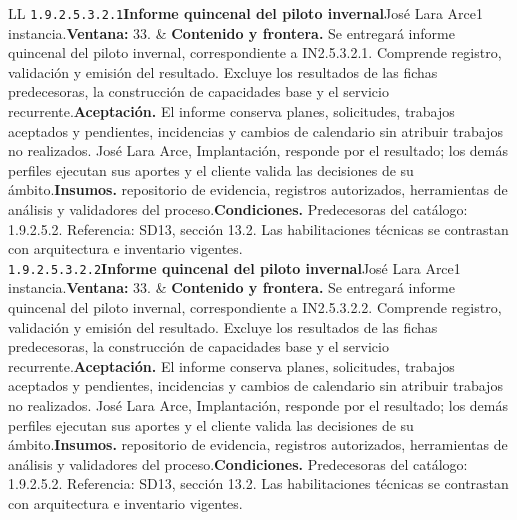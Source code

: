 \begin{longtable}{L{\tabcolsep\relax}L{\tabcolsep\relax}}
\texttt{1.\allowbreak{}9.\allowbreak{}2.\allowbreak{}5.\allowbreak{}3.\allowbreak{}2.\allowbreak{}1}\newline{}\textbf{Informe quincenal del piloto invernal}\newline{}José Lara Arce\newline{}1 instancia.\newline{}\textbf{Ventana:} 33. & \textbf{Contenido y frontera.} Se entregará informe quincenal del piloto invernal, correspondiente a IN2.5.3.2.1. Comprende registro, validación y emisión del resultado. Excluye los resultados de las fichas predecesoras, la construcción de capacidades base y el servicio recurrente.\newline{}\textbf{Aceptación.} El informe conserva planes, solicitudes, trabajos aceptados y pendientes, incidencias y cambios de calendario sin atribuir trabajos no realizados. José Lara Arce, Implantación, responde por el resultado; los demás perfiles ejecutan sus aportes y el cliente valida las decisiones de su ámbito.\newline{}\textbf{Insumos.} repositorio de evidencia, registros autorizados, herramientas de análisis y validadores del proceso.\newline{}\textbf{Condiciones.} Predecesoras del catálogo: 1.9.2.5.2. Referencia: SD13, sección 13.2. Las habilitaciones técnicas se contrastan con arquitectura e inventario vigentes.\\\hline
\texttt{1.\allowbreak{}9.\allowbreak{}2.\allowbreak{}5.\allowbreak{}3.\allowbreak{}2.\allowbreak{}2}\newline{}\textbf{Informe quincenal del piloto invernal}\newline{}José Lara Arce\newline{}1 instancia.\newline{}\textbf{Ventana:} 33. & \textbf{Contenido y frontera.} Se entregará informe quincenal del piloto invernal, correspondiente a IN2.5.3.2.2. Comprende registro, validación y emisión del resultado. Excluye los resultados de las fichas predecesoras, la construcción de capacidades base y el servicio recurrente.\newline{}\textbf{Aceptación.} El informe conserva planes, solicitudes, trabajos aceptados y pendientes, incidencias y cambios de calendario sin atribuir trabajos no realizados. José Lara Arce, Implantación, responde por el resultado; los demás perfiles ejecutan sus aportes y el cliente valida las decisiones de su ámbito.\newline{}\textbf{Insumos.} repositorio de evidencia, registros autorizados, herramientas de análisis y validadores del proceso.\newline{}\textbf{Condiciones.} Predecesoras del catálogo: 1.9.2.5.2. Referencia: SD13, sección 13.2. Las habilitaciones técnicas se contrastan con arquitectura e inventario vigentes.\\\hline

\end{longtable}
